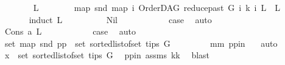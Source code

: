 \begin{isabellebody}
\ \ \ \ \ \ \isamarkupfalse%
\ L\isanewline
\ \ \ \ \ \ \isamarkupfalse%
\ {\isachardoublequoteopen}map\ snd\ {\isacharparenleft}{\kern0pt}map\ {\isacharparenleft}{\kern0pt}{\isasymlambda}i{\isachardot}{\kern0pt}\ {\isacharparenleft}{\kern0pt}OrderDAG\ {\isacharparenleft}{\kern0pt}reduce{\isacharunderscore}{\kern0pt}past\ G\ i{\isacharparenright}{\kern0pt}\ k{\isacharcomma}{\kern0pt}\ i{\isacharparenright}{\kern0pt}{\isacharparenright}{\kern0pt}\ L{\isacharparenright}{\kern0pt}\ {\isacharequal}{\kern0pt}\ L{\isachardoublequoteclose}\isanewline
\ \ \ \ \ \ \isamarkupfalse%
{\isacharparenleft}{\kern0pt}induct\ L{\isacharparenright}{\kern0pt}\isanewline
\ \ \ \ \ \ \ \ \isamarkupfalse%
\ Nil\isanewline
\ \ \ \ \ \ \ \ \isamarkupfalse%
\ \isamarkupfalse%
\ {\isacharquery}{\kern0pt}case\ \isamarkupfalse%
\ auto\isanewline
\ \ \ \ \ \ \isamarkupfalse%
\isanewline
\ \ \ \ \ \ \ \ \isamarkupfalse%
\ {\isacharparenleft}{\kern0pt}Cons\ a\ L{\isacharparenright}{\kern0pt}\isanewline
\ \ \ \ \ \ \ \ \isamarkupfalse%
\ \isamarkupfalse%
\ {\isacharquery}{\kern0pt}case\ \isamarkupfalse%
\ auto\isanewline
\ \ \ \ \ \ \isamarkupfalse%
\isanewline
\ \ \ \ \isamarkupfalse%
\isanewline
\ \ \ \ \isamarkupfalse%
\ {\isachardoublequoteopen}set\ {\isacharparenleft}{\kern0pt}map\ snd\ pp{\isacharparenright}{\kern0pt}\ {\isacharequal}{\kern0pt}\ set\ {\isacharparenleft}{\kern0pt}sorted{\isacharunderscore}{\kern0pt}list{\isacharunderscore}{\kern0pt}of{\isacharunderscore}{\kern0pt}set\ {\isacharparenleft}{\kern0pt}tips\ G{\isacharparenright}{\kern0pt}{\isacharparenright}{\kern0pt}{\isachardoublequoteclose}\ \isanewline
\ \ \ \ \ \ \isamarkupfalse%
\ mm{}\ pp{\isacharunderscore}{\kern0pt}in\ \ \isamarkupfalse%
\ auto\isanewline
\ \ \ \ \isamarkupfalse%
\ \isamarkupfalse%
\ {\isachardoublequoteopen}x\ {\isasymin}\ set\ {\isacharparenleft}{\kern0pt}sorted{\isacharunderscore}{\kern0pt}list{\isacharunderscore}{\kern0pt}of{\isacharunderscore}{\kern0pt}set\ {\isacharparenleft}{\kern0pt}tips\ G{\isacharparenright}{\kern0pt}{\isacharparenright}{\kern0pt}{\isachardoublequoteclose}\ \isamarkupfalse%
\ pp{\isacharunderscore}{\kern0pt}in\ assms{\isacharparenleft}{\kern0pt}{}{\isacharparenright}{\kern0pt}\ kk\ \isamarkupfalse%
\ blast\ \isanewline

\end{isabellebody}
